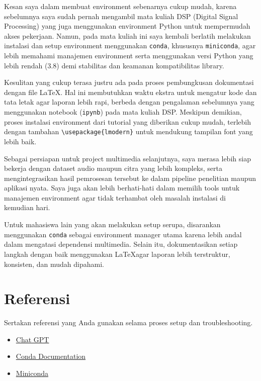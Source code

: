 \documentclass[11pt,a4paper]{article}
\begin{document}
Kesan saya dalam membuat environment sebenarnya cukup mudah, karena sebelumnya saya sudah pernah mengambil mata kuliah DSP (Digital Signal Processing) yang juga menggunakan environment Python untuk mempermudah akses pekerjaan. Namun, pada mata kuliah ini saya kembali berlatih melakukan instalasi dan setup environment menggunakan \texttt{conda}, khususnya \texttt{miniconda}, agar lebih memahami manajemen environment serta menggunakan versi Python yang lebih rendah (3.8) demi stabilitas dan keamanan kompatibilitas library.

Kesulitan yang cukup terasa justru ada pada proses pembungkusan dokumentasi dengan file \LaTeX. Hal ini membutuhkan waktu ekstra untuk mengatur kode dan tata letak agar laporan lebih rapi, berbeda dengan pengalaman sebelumnya yang menggunakan notebook (\texttt{ipynb}) pada mata kuliah DSP. Meskipun demikian, proses instalasi environment dari tutorial yang diberikan cukup mudah, terlebih dengan tambahan \verb|\usepackage{lmodern}| untuk mendukung tampilan font yang lebih baik.

Sebagai persiapan untuk project multimedia selanjutnya, saya merasa lebih siap bekerja dengan dataset audio maupun citra yang lebih kompleks, serta mengintegrasikan hasil pemrosesan tersebut ke dalam pipeline penelitian maupun aplikasi nyata. Saya juga akan lebih berhati-hati dalam memilih tools untuk manajemen environment agar tidak terhambat oleh masalah instalasi di kemudian hari.

Untuk mahasiswa lain yang akan melakukan setup serupa, disarankan menggunakan \texttt{conda} sebagai environment manager utama karena lebih andal dalam mengatasi dependensi multimedia. Selain itu, dokumentasikan setiap langkah dengan baik menggunakan \LaTeX agar laporan lebih terstruktur, konsisten, dan mudah dipahami.

\section{Referensi}
Sertakan referensi yang Anda gunakan selama proses setup dan troubleshooting.
\begin{itemize}
    \item \href{https://chatgpt.com/share/68c93b9a-f66c-8009-849a-e90e79e56e14}{Chat GPT}
    \item \href{https://docs.conda.io/en/latest/}{Conda Documentation}
    \item \href{https://www.anaconda.com/products/individual}{Miniconda}
\end{itemize}
\newpage


\end{document}
